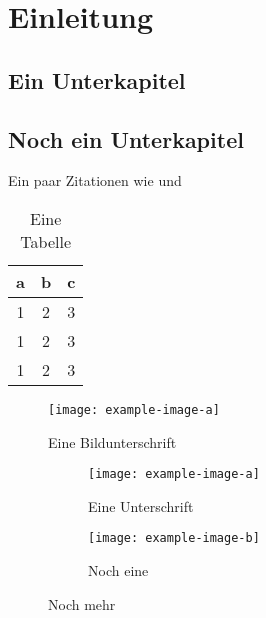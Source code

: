 \chapter{Einleitung}
\label{ch:intro}

\blindtext

\section{Ein Unterkapitel}
\Blindtext

\section{Noch ein Unterkapitel}
\blindmathpaper
\Blindtext


Ein paar Zitationen wie \cite{Hartley2004} und \cite{Bishop2006} 

\begin{table}[ht]
	\centering
	\begin{tabular}{c|c|c}
		a & b & c \\ \hline
		1 & 2 & 3 \\
		1 & 2 & 3 \\
		1 & 2 & 3
	\end{tabular}
	\caption{Eine Tabelle}
\end{table}

\begin{figure}[ht]
	\centering
	\texttt{[image: example-image-a]}
	\caption{Eine Bildunterschrift}
\end{figure}

\begin{figure}[ht]
	\centering
	\begin{subfigure}[b]{0.45\textwidth}
		\texttt{[image: example-image-a]}
		\caption{Eine Unterschrift}
	\end{subfigure} \hfill
	\begin{subfigure}[b]{0.45\textwidth}
		\texttt{[image: example-image-b]}
		\caption{Noch eine}
	\end{subfigure}
	\caption{Noch mehr}
\end{figure}

